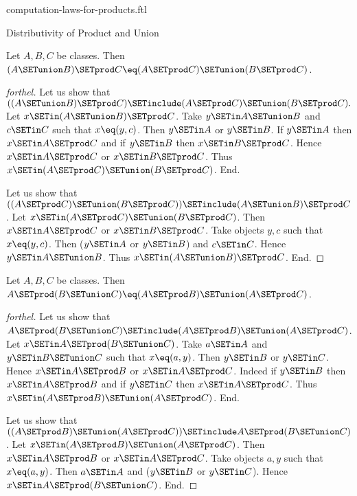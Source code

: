 \documentclass{naproche-library}
\begin{document}
\begin{smodule}[title=Computation Laws for Cartesian Products]{computation-laws-for-products.ftl}
\begin{sfragment}{Distributivity of Product and Union}
  \begin{proposition}[forthel,id=FOUNDATIONS_05_8849658323402752]
    Let $A, B, C$ be classes.
    Then $(A \SETunion B) \SETprod C \eq (A \SETprod C) \SETunion (B \SETprod C)$.
  \end{proposition}
  \begin{proof}[forthel]
    Let us show that $((A \SETunion B) \SETprod C) \SETinclude (A \SETprod C) \SETunion (B \SETprod C).$ %
      Let $x \SETin (A \SETunion B) \SETprod C$.
      Take $y \SETin A \SETunion B$ and $c \SETin C$ such that $x \eq (y, c)$.
      Then $y \SETin A$ or $y \SETin B$.
      If $y \SETin A$ then $x \SETin A \SETprod C$ and if $y \SETin B$ then $x \SETin B \SETprod C$.
      Hence $x \SETin A \SETprod C$ or $x \SETin B \SETprod C$.
      Thus $x \SETin (A \SETprod C) \SETunion (B \SETprod C)$.
    End.

    Let us show that $((A \SETprod C) \SETunion (B \SETprod C)) \SETinclude (A \SETunion B) \SETprod C$. %
      Let $x \SETin (A \SETprod C) \SETunion (B \SETprod C)$.
      Then $x \SETin A \SETprod C$ or $x \SETin B \SETprod C$.
      Take objects $y, c$ such that $x \eq (y, c)$.
      Then ($y \SETin A$ or $y \SETin B$) and $c \SETin C$.
      Hence $y \SETin A \SETunion B$.
      Thus $x \SETin (A \SETunion B) \SETprod C$.
    End.
  \end{proof}

  \begin{proposition}[forthel,id=FOUNDATIONS_05_476526841692160]
    Let $A, B, C$ be classes.
    Then $A \SETprod (B \SETunion C) \eq (A \SETprod B) \SETunion (A \SETprod C)$.
  \end{proposition}
  \begin{proof}[forthel]
    Let us show that $A \SETprod (B \SETunion C) \SETinclude (A \SETprod B) \SETunion (A \SETprod C)$.
      Let $x \SETin A \SETprod (B \SETunion C)$.
      Take $a \SETin A$ and $y \SETin B \SETunion C$ such that $x \eq (a, y)$.
      Then $y \SETin B$ or $y \SETin C$.
      Hence $x \SETin A \SETprod B$ or $x \SETin A \SETprod C$.
      Indeed if $y \SETin B$ then $x \SETin A \SETprod B$ and if $y \SETin C$ then $x \SETin A \SETprod C$.
      Thus $x \SETin (A \SETprod B) \SETunion (A \SETprod C)$.
    End.

    Let us show that $((A \SETprod B) \SETunion (A \SETprod C)) \SETinclude A \SETprod (B \SETunion C)$.
      Let $x \SETin (A \SETprod B) \SETunion (A \SETprod C)$.
      Then $x \SETin A \SETprod B$ or $x \SETin A \SETprod C$.
      Take objects $a, y$ such that $x \eq (a, y)$.
      Then $a \SETin A$ and ($y \SETin B$ or $y \SETin C$).
      Hence $x \SETin A \SETprod (B \SETunion C)$.
    End.
  \end{proof}
\end{sfragment}


\end{smodule}
\end{document}
